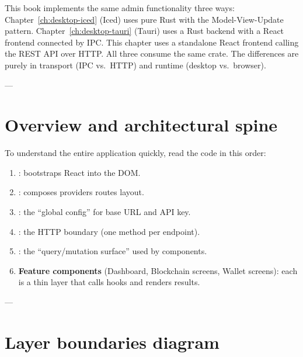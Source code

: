 \begin{infobox}
This book implements the same admin functionality three ways: Chapter~\ref{ch:desktop-iced} (Iced) uses pure Rust with the Model-View-Update pattern. Chapter~\ref{ch:desktop-tauri} (Tauri) uses a Rust backend with a React frontend connected by IPC. This chapter uses a standalone React frontend calling the REST API over HTTP. All three consume the same  crate. The differences are purely in transport (IPC vs.\ HTTP) and runtime (desktop vs.\ browser).
\end{infobox}

---

\section{Overview and architectural spine}
\label{sec:web-ui-overview}

To understand the entire application quickly, read the code in this order:

\begin{enumerate}
  \item \textbf{}: bootstraps React into the DOM.
  \item \textbf{}: composes providers \code{+} routes \code{+} layout.
  \item \textbf{}: the ``global config'' for base URL and API key.
  \item \textbf{}: the HTTP boundary (one method per endpoint).
  \item \textbf{}: the ``query/mutation surface'' used by components.
  \item \textbf{Feature components} (Dashboard, Blockchain screens, Wallet screens): each is a thin layer that calls hooks and renders results.
\end{enumerate}

---

\section{Layer boundaries diagram}
\label{sec:layer-boundaries}

